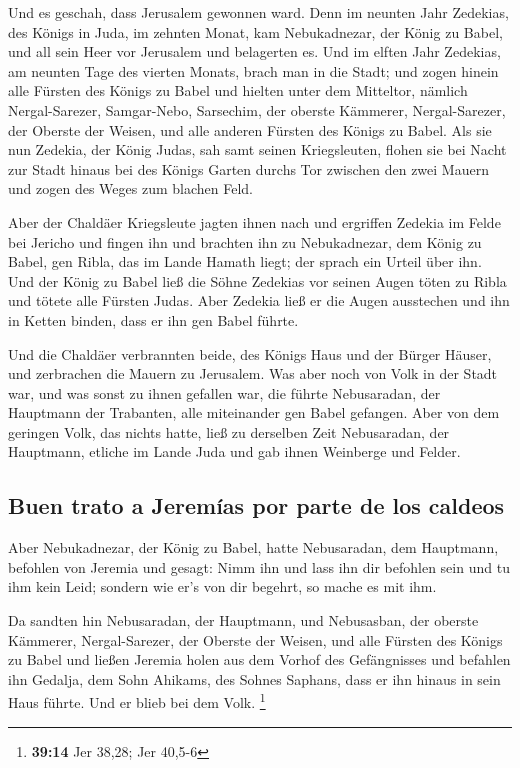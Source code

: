  Und es geschah, dass Jerusalem gewonnen ward. Denn im
neunten Jahr Zedekias, des Königs in Juda, im zehnten Monat, kam
Nebukadnezar, der König zu Babel, und all sein Heer vor Jerusalem und
belagerten es.  Und im elften Jahr Zedekias, am neunten
Tage des vierten Monats, brach man in die Stadt;  und
zogen hinein alle Fürsten des Königs zu Babel und hielten unter dem
Mitteltor, nämlich Nergal-Sarezer, Samgar-Nebo, Sarsechim, der oberste
Kämmerer, Nergal-Sarezer, der Oberste der Weisen, und alle anderen
Fürsten des Königs zu Babel.  Als sie nun Zedekia, der
König Judas, sah samt seinen Kriegsleuten, flohen sie bei Nacht zur
Stadt hinaus bei des Königs Garten durchs Tor zwischen den zwei Mauern
und zogen des Weges zum blachen Feld.

 Aber der Chaldäer Kriegsleute jagten ihnen nach und
ergriffen Zedekia im Felde bei Jericho und fingen ihn und brachten ihn
zu Nebukadnezar, dem König zu Babel, gen Ribla, das im Lande Hamath
liegt; der sprach ein Urteil über ihn.  Und der König zu
Babel ließ die Söhne Zedekias vor seinen Augen töten zu Ribla und tötete
alle Fürsten Judas.  Aber Zedekia ließ er die Augen
ausstechen und ihn in Ketten binden, dass er ihn gen Babel führte.

 Und die Chaldäer verbrannten beide, des Königs Haus und
der Bürger Häuser, und zerbrachen die Mauern zu Jerusalem.
 Was aber noch von Volk in der Stadt war, und was sonst zu
ihnen gefallen war, die führte Nebusaradan, der Hauptmann der Trabanten,
alle miteinander gen Babel gefangen.  Aber von dem
geringen Volk, das nichts hatte, ließ zu derselben Zeit Nebusaradan, der
Hauptmann, etliche im Lande Juda und gab ihnen Weinberge und Felder.

\hypertarget{buen-trato-a-jeremuxedas-por-parte-de-los-caldeos}{%
\subsection{Buen trato a Jeremías por parte de los
caldeos}\label{buen-trato-a-jeremuxedas-por-parte-de-los-caldeos}}

 Aber Nebukadnezar, der König zu Babel, hatte
Nebusaradan, dem Hauptmann, befohlen von Jeremia und gesagt:
 Nimm ihn und lass ihn dir befohlen sein und tu ihm kein
Leid; sondern wie er's von dir begehrt, so mache es mit ihm.

 Da sandten hin Nebusaradan, der Hauptmann, und
Nebusasban, der oberste Kämmerer, Nergal-Sarezer, der Oberste der
Weisen, und alle Fürsten des Königs zu Babel  und ließen
Jeremia holen aus dem Vorhof des Gefängnisses und befahlen ihn Gedalja,
dem Sohn Ahikams, des Sohnes Saphans, dass er ihn hinaus in sein Haus
führte. Und er blieb bei dem Volk. \footnote{\textbf{39:14} Jer 38,28;
  Jer 40,5-6}

